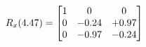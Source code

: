 \documentclass[preview]{standalone}
\begin{document}
\begin{align*}
\special{dvisvgm:raw <g id='unique000'>}R_{x}(4.47) = \begin{bmatrix}1 & 0 & 0 \\0 & -0.24 & +0.97 \\0 & -0.97 & -0.24\end{bmatrix}\special{dvisvgm:raw </g>}
\end{align*}
\end{document}
